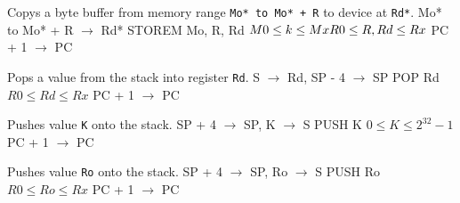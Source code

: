 \documentclass[titlepage]{scrartcl}
\begin{document}
{Copys a byte buffer from memory range \texttt{Mo* to Mo* + R} to device at \texttt{Rd*}.}
{Mo* to Mo* + R $\rightarrow$ Rd*}
{STOREM Mo, R, Rd}
{$M0 \leq k \leq Mx \hfill \break R0 \leq R, Rd \leq Rx$}
{PC + 1 $\rightarrow$ PC}
{}
{\srtable{}{}{}{}}

{Pops a value from the stack into register \texttt{Rd}.}
{S $\rightarrow$ Rd, SP - 4 $\rightarrow$ SP}
{POP Rd}
{$R0 \leq Rd \leq Rx$}
{PC + 1 $\rightarrow$ PC}
{}
{\srtable{}{}{}{}}

{Pushes value \texttt{K} onto the stack.}
{SP + 4 $\rightarrow$ SP, K $\rightarrow$ S}
{PUSH K}
{$0 \leq K \leq 2^{32} - 1$}
{PC + 1 $\rightarrow$ PC}
{}
{\srtable{}{}{}{}}

{Pushes value \texttt{Ro} onto the stack.}
{SP + 4 $\rightarrow$ SP, Ro $\rightarrow$ S}
{PUSH Ro}
{$R0 \leq Ro \leq Rx$}
{PC + 1 $\rightarrow$ PC}
{}
{\srtable{}{}{}{}}

\end{document}
